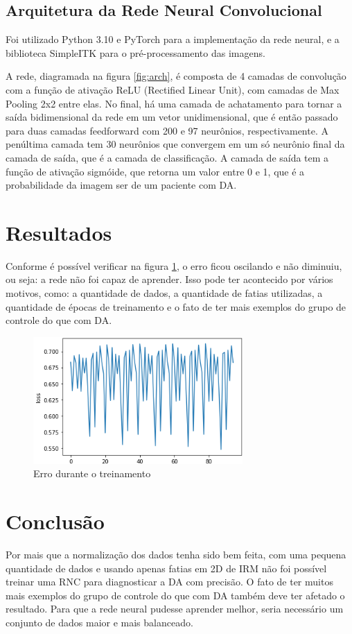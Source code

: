 \documentclass[conference]{IEEEtran}
\begin{document}
\subsection{Arquitetura da Rede Neural Convolucional}

Foi utilizado Python 3.10 e PyTorch para a implementação da rede neural, e a biblioteca SimpleITK para o pré-processamento das imagens.

A rede, diagramada na figura \ref{fig:arch}, é composta de 4 camadas de convolução com a função de ativação ReLU (Rectified Linear Unit), com camadas de Max Pooling 2x2 entre elas. No final, há uma camada de achatamento para tornar a saída bidimensional da rede em um vetor unidimensional, que é então passado para duas camadas feedforward com 200 e 97 neurônios, respectivamente. A penúltima camada tem 30 neurônios que convergem em um só neurônio final da camada de saída, que é a camada de classificação. A camada de saída tem a função de ativação sigmóide, que retorna um valor entre 0 e 1, que é a probabilidade da imagem ser de um paciente com DA.

\section{Resultados}

Conforme é possível verificar na figura \ref{fig:loss}, o erro ficou oscilando e não diminuiu, ou seja: a rede não foi capaz de aprender. Isso pode ter acontecido por vários motivos, como: a quantidade de dados, a quantidade de fatias utilizadas, a quantidade de épocas de treinamento e o fato de ter mais exemplos do grupo de controle do que com DA. 

\begin{figure}[H]
\centering
\includegraphics[width=8cm]{img/loss.png}
\caption{Erro durante o treinamento}
\label{fig:loss}
\end{figure}

\section{Conclusão}

Por mais que a normalização dos dados tenha sido bem feita, com uma pequena quantidade de dados e usando apenas fatias em 2D de IRM não foi possível treinar uma RNC para diagnosticar a DA com precisão. O fato de ter muitos mais exemplos do grupo de controle do que com DA também deve ter afetado o resultado. Para que a rede neural pudesse aprender melhor, seria necessário um conjunto de dados maior e mais balanceado.

  

\end{document}
